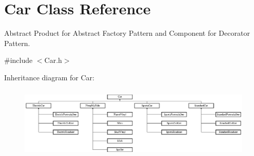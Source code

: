 \hypertarget{class_car}{}\section{Car Class Reference}
\label{class_car}


Abstract Product for Abstract Factory Pattern and Component for Decorator Pattern.  




{\ttfamily \#include $<$Car.\+h$>$}

Inheritance diagram for Car\+:\begin{figure}[H]
\begin{center}
\leavevmode
\includegraphics[height=3.475177cm]{class_car}
\end{center}
\end{figure}
